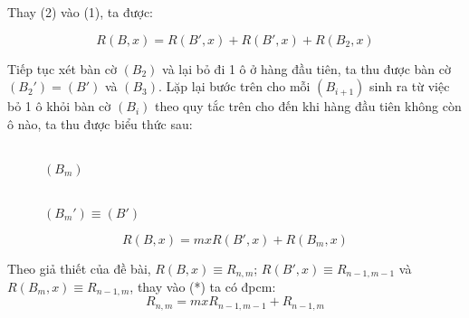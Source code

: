 \documentclass[main.tex]{subfiles}
\begin{document}
Thay (2) vào (1), ta được:

\begin{equation*}
R(B,x) = R(B', x) + R(B', x) + R(B_2, x)
\end{equation*}

Tiếp tục xét bàn cờ $(B_2)$ và lại bỏ đi 1 ô ở hàng đầu tiên, ta thu được bàn cờ $(B_2') = (B')$ và $(B_3)$. Lặp lại bước trên cho mỗi $(B_{i+1})$ sinh ra từ việc bỏ 1 ô khỏi bàn cờ $(B_i)$ theo quy tắc trên cho đến khi hàng đầu tiên không còn ô nào, ta thu được biểu thức sau:

\begin{figure}[H]
    \newcommand{\0}{\textcolor{red}{0}}
    \centering
    \begin{minipage}{0.49\textwidth}
        \centering
         \\
        $(B_m)$
    \end{minipage}
    \begin{minipage}{0.49\textwidth}
        \centering
         \\
        $(B_m') \equiv (B')$
    \end{minipage}
\end{figure}

\begin{equation*}
    R(B, x) = mxR(B', x) + R(B_m,x) \tag{*}
\end{equation*}

Theo giả thiết của đề bài, $R(B, x) \equiv R_{n,m}$; $R(B',x) \equiv R_{n-1,m-1}$ và $R(B_m,x) \equiv R_{n-1,m}$, thay vào (*) ta có đpcm:
\begin{equation*}
    R_{n,m} = mxR_{n-1,m-1} + R_{n-1,m}
\end{equation*}
\end{document}
